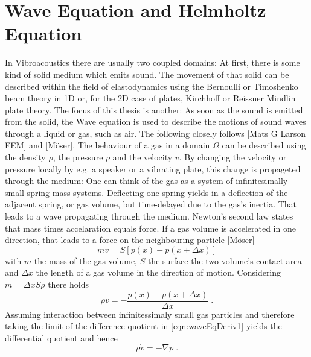 \documentclass[%
  a4paper,oneside,%
  11pt,%
  smallchapters,
  green,%
  rgb, <cmyk>
  ,]{tubsbook}
\begin{document}
\section{Wave Equation and Helmholtz Equation}
In Vibroacoustics there are usually two coupled domains: At first, there is some kind of solid medium which emits sound. The movement of that solid can be described within the field of elastodynamics using the Bernoulli or Timoshenko beam theory in 1D or, for the 2D case of plates, Kirchhoff or Reissner Mindlin plate theory. The focus of this thesis is another: As soon as the sound is emitted from the solid, the Wave equation is used to describe the motions of sound waves through a liquid or gas, such as air. 
The following closely follows [Mats G Larson FEM] and [Möser].
The behaviour of a gas in a domain $\Omega$ can be described using the density $\rho$, the pressure $p$ and the velocity $v$. By changing the velocity or pressure locally by e.g. a speaker or a vibrating plate, this change is propageted through the medium: One can think of the gas as a system of infinitesimally small spring-mass systems. Deflecting one spring yields in a deflection of the adjacent spring, or gas volume, but time-delayed due to the gas's inertia. That leads to a wave propagating through the medium. 
Newton's second law states that mass times accelaration equals force. If a gas volume is accelerated in one direction, that leads to a force on the neighbouring particle [Möser]
%
\begin{equation}
m \dot{v} = S  \left[  p(x) -p(x + \Delta x)  \right] 
\end{equation}
with $m$ the mass of the gas volume, $S$ the surface the two volume's contact area and $\Delta x$ the length of a gas volume in the direction of motion. Considering $m = \Delta x S \rho$ there holds
\begin{equation}
\rho \dot{v} = - \frac{p(x) -p(x + \Delta x)}{\Delta x} \; .
\label{eqn:waveEqDeriv1}
\end{equation}
Assuming interaction between infinitessimaly small gas particles and therefore taking the limit of the difference quotient in \ref{eqn:waveEqDeriv1} yields the differential quotient and hence
\begin{equation}
\rho \dot{v} = - \nabla p \;.
\label{eqn:Tragheitsges}
\end{equation}
\end{document}

